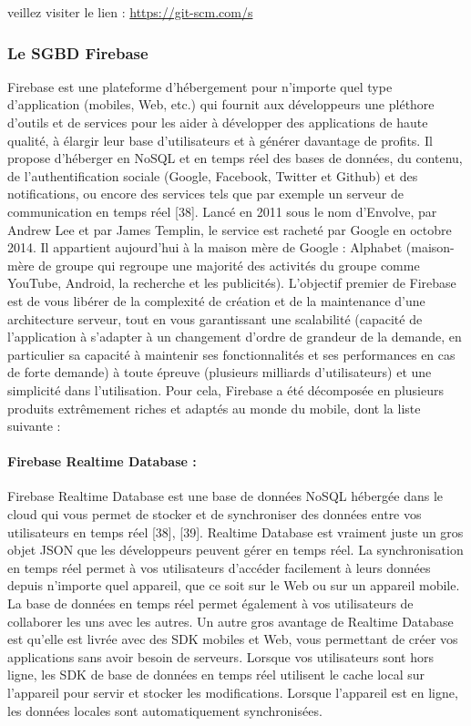 veillez
visiter le lien :
\href{https://git-scm.com/s}{https://git-scm.com/s}
\subsubsection{Le SGBD Firebase}
Firebase est une plateforme d’hébergement pour n’importe quel type d’application (mobiles,
Web, etc.) qui fournit aux développeurs une pléthore d'outils et de services pour les aider à
développer des applications de haute qualité, à élargir leur base d'utilisateurs et à générer
davantage de profits. Il propose d'héberger en NoSQL et en temps réel des bases de données,
du contenu, de l'authentification sociale (Google, Facebook, Twitter et Github) et des notifications, ou encore des services tels que par exemple un serveur de communication en
temps réel [38].
Lancé en 2011 sous le nom d'Envolve, par Andrew Lee et par James Templin, le service est
racheté par Google en octobre 2014. Il appartient aujourd'hui à la maison mère de Google :
Alphabet (maison-mère de groupe qui regroupe une majorité des activités du groupe comme
YouTube, Android, la recherche et les publicités). L'objectif premier de Firebase est de vous
libérer de la complexité de création et de la maintenance d'une architecture serveur, tout en vous
garantissant une scalabilité (capacité de l’application à s'adapter à un changement d'ordre de
grandeur de la demande, en particulier sa capacité à maintenir ses fonctionnalités et ses
performances en cas de forte demande) à toute épreuve (plusieurs milliards d'utilisateurs) et une
simplicité dans l'utilisation. Pour cela, Firebase a été décomposée en plusieurs produits
extrêmement riches et adaptés au monde du mobile, dont la liste suivante :
\setcounter{secnumdepth}{5}
\paragraph{Firebase Realtime Database :\newline}

 Firebase Realtime Database est une base de données NoSQL hébergée dans le cloud qui vous
permet de stocker et de synchroniser des données entre vos utilisateurs en temps réel [38], [39].
Realtime Database est vraiment juste un gros objet JSON que les développeurs peuvent gérer
en temps réel.
La synchronisation en temps réel permet à vos utilisateurs d'accéder facilement à leurs données
depuis n'importe quel appareil, que ce soit sur le Web ou sur un appareil mobile. La base de
données en temps réel permet également à vos utilisateurs de collaborer les uns avec les autres.
Un autre gros avantage de Realtime Database est qu'elle est livrée avec des SDK mobiles et
Web, vous permettant de créer vos applications sans avoir besoin de serveurs. Lorsque vos
utilisateurs sont hors ligne, les SDK de base de données en temps réel utilisent le cache local
sur l'appareil pour servir et stocker les modifications. Lorsque l'appareil est en ligne, les données
locales sont automatiquement synchronisées.
